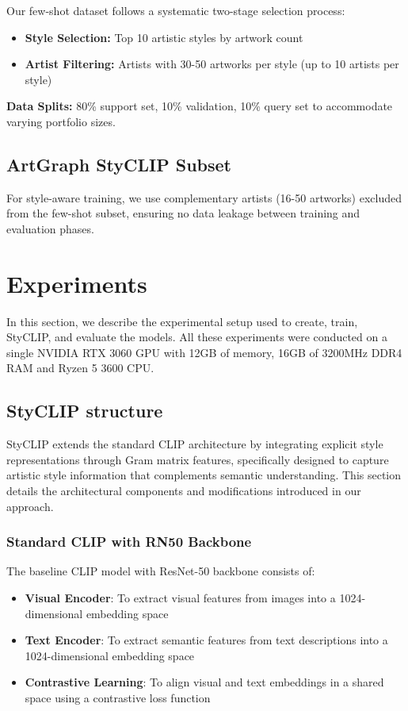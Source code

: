 \documentclass[conference,6pt]{IEEEtran}
\begin{document}
Our few-shot dataset follows a systematic two-stage selection process:

\begin{itemize}
    \item \textbf{Style Selection:} Top 10 artistic styles by artwork count
    \item \textbf{Artist Filtering:} Artists with 30-50 artworks per style (up to 10 artists per style)
\end{itemize}

\textbf{Data Splits:} 80\% support set, 10\% validation, 10\% query set to accommodate varying portfolio sizes.

\subsection{ArtGraph StyCLIP Subset}

For style-aware training, we use complementary artists (16-50 artworks) excluded from the few-shot subset, ensuring no data leakage between training and evaluation phases.
\section{Experiments}

In this section, we describe the experimental setup used to create, train, StyCLIP, and evaluate the models.
All these experiments were conducted on a single NVIDIA RTX 3060 GPU with 12GB of memory, 16GB of 3200MHz DDR4 RAM and Ryzen 5 3600 CPU.

\subsection{StyCLIP structure}

StyCLIP extends the standard CLIP architecture by integrating explicit style representations through Gram matrix features, specifically designed to capture artistic style information that complements semantic understanding. This section details the architectural components and modifications introduced in our approach.

\subsubsection{Standard CLIP with RN50 Backbone}

The baseline CLIP model with ResNet-50 backbone consists of:
\begin{itemize}
    \item \textbf{Visual Encoder}: To extract visual features from images into a 1024-dimensional embedding space
    \item \textbf{Text Encoder}: To extract semantic features from text descriptions into a 1024-dimensional embedding space
    \item \textbf{Contrastive Learning}: To align visual and text embeddings in a shared space using a contrastive loss function
\end{itemize}
\end{document}
